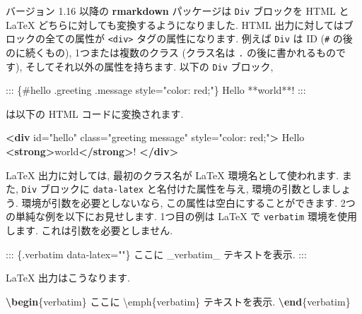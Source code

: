 \documentclass[
  11pt,
  lualatex,ja=standard,jafont=noto]{bxjsreport}
\newenvironment{Shaded}{\begin{snugshade}}{\end{snugshade}}
\newcommand{\ExtensionTok}[1]{#1}
\newcommand{\KeywordTok}[1]{\textcolor[rgb]{0.13,0.29,0.53}{\textbf{#1}}}
\newcommand{\NormalTok}[1]{#1}
\newcommand{\OtherTok}[1]{\textcolor[rgb]{0.56,0.35,0.01}{#1}}
\newcommand{\StringTok}[1]{\textcolor[rgb]{0.31,0.60,0.02}{#1}}
\newcommand{\VerbatimStringTok}[1]{\textcolor[rgb]{0.31,0.60,0.02}{#1}}
\begin{document}
バージョン 1.16 以降の \textbf{rmarkdown} パッケージは \texttt{Div} ブロックを HTML と LaTeX どちらに対しても変換するようになりました. HTML 出力に対してはブロックの全ての属性が \texttt{\textless{}div\textgreater{}} タグの属性になります. 例えば \texttt{Div} は ID (\texttt{\#} の後のに続くもの), 1つまたは複数のクラス (クラス名は \texttt{.} の後に書かれるものです), そしてそれ以外の属性を持ちます. 以下の \texttt{Div} ブロック,

\begin{Shaded}
\begin{Highlighting}[]
\NormalTok{::: \{\#hello .greeting .message style="color: red;"\}}
\NormalTok{Hello **world**!}
\NormalTok{:::}
\end{Highlighting}
\end{Shaded}

は以下の HTML コードに変換されます.

\begin{Shaded}
\begin{Highlighting}[]
\KeywordTok{\textless{}div}\OtherTok{ id=}\StringTok{"hello"}\OtherTok{ class=}\StringTok{"greeting message"}\OtherTok{ style=}\StringTok{"color: red;"}\KeywordTok{\textgreater{}}
\NormalTok{  Hello }\KeywordTok{\textless{}strong\textgreater{}}\NormalTok{world}\KeywordTok{\textless{}/strong\textgreater{}}\NormalTok{!}
\KeywordTok{\textless{}/div\textgreater{}}
\end{Highlighting}
\end{Shaded}

LaTeX 出力に対しては, 最初のクラス名が LaTeX 環境名として使われます. また, \texttt{Div} ブロックに \texttt{data-latex} と名付けた属性を与え, 環境の引数としましょう. 環境が引数を必要としないなら, この属性は空白にすることができます. 2つの単純な例を以下にお見せします. 1つ目の例は LaTeX で \texttt{verbatim} 環境を使用します. これは引数を必要としません.

\begin{Shaded}
\begin{Highlighting}[]
\NormalTok{::: \{.verbatim data{-}latex=""\}}
\NormalTok{ここに \_verbatim\_ テキストを表示.}
\NormalTok{:::}
\end{Highlighting}
\end{Shaded}

LaTeX 出力はこうなります.

\begin{Shaded}
\begin{Highlighting}[]
\KeywordTok{\textbackslash{}begin}\NormalTok{\{}\ExtensionTok{verbatim}\NormalTok{\}}
\VerbatimStringTok{ここに \textbackslash{}emph\{verbatim\} テキストを表示.}
\KeywordTok{\textbackslash{}end}\NormalTok{\{}\ExtensionTok{verbatim}\NormalTok{\}}
\end{Highlighting}
\end{Shaded}
\end{document}
